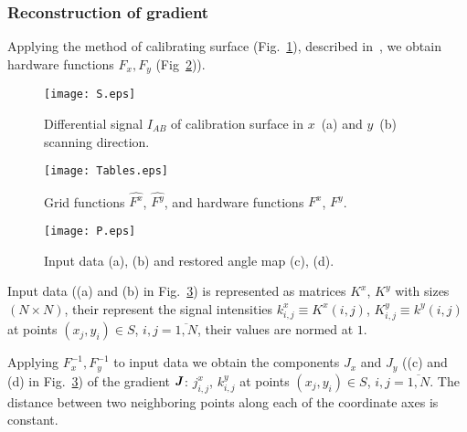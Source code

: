 \documentclass{beamer}
\begin{document}
\begin{frame}[allowframebreaks]
    \frametitle{Reconstruction of gradient}

    Applying the method of calibrating surface (Fig.~\ref{fig:inputSphere}), described in~\cite{main},
    we obtain hardware functions $F_x, F_y$ (Fig~\ref{fig:Tables})).

    \begin{figure}[hp]
        \texttt{[image: S.eps]}
        \caption{\small Differential signal $I_{AB}$ of calibration surface in $x$~(a) and $y$~(b)
        scanning direction.}
        {\label{fig:inputSphere}}%
    \end{figure}

    \newpage

    \begin{figure}
        \texttt{[image: Tables.eps]}
        \caption{Grid functions $\hat{F^x}$, $\hat{F^y}$, and hardware functions $F^x$, $F^y$.}
        {\label{fig:Tables}}%
    \end{figure}

    \newpage

    \begin{figure}
        \texttt{[image: P.eps]}
        \caption{Input data (a), (b) and restored angle map (c), (d).}
        {\label{fig:input_data}}%
    \end{figure}

    Input data ((a) and (b) in Fig.~\ref{fig:input_data}) is represented as matrices $K^x$, $K^y$
    with sizes $(N \times N)$, their represent the signal intensities $k^x_{i,j} \equiv K^x (i,j)$,
    $K^y_{i,j} \equiv k^y (i,j)$ at points $(x_j, y_i) \in S$, $i,j = \overline{1,N}$, their values
    are normed at $1$.

    Applying $F_x^{-1}, F_y^{-1}$ to input data we obtain the components $J_x$ and $J_y$
    ((c) and (d) in Fig.~\ref{fig:input_data}) of the gradient ${\textbf{\emph{J}}}$: $j^x_{i,j}$,
    $k^y_{i,j}$ at points $(x_j, y_i) \in S$, $i,j = \overline{1,N}$. The distance between two
    neighboring points along each of the coordinate axes is constant.

\end{frame}
\end{document}
